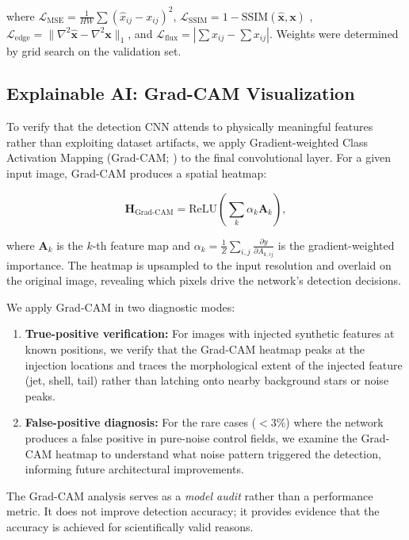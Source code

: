\documentclass[preprint2]{aastex631}
\begin{document}
where $\mathcal{L}_{\text{MSE}} = \frac{1}{HW}\sum(\hat{x}_{ij} - x_{ij})^2$, $\mathcal{L}_{\text{SSIM}} = 1 - \text{SSIM}(\hat{\mathbf{x}}, \mathbf{x})$ \citep{wang04}, $\mathcal{L}_{\text{edge}} = \|\nabla^2\hat{\mathbf{x}} - \nabla^2\mathbf{x}\|_1$, and $\mathcal{L}_{\text{flux}} = |\sum\hat{x}_{ij} - \sum x_{ij}|$. Weights were determined by grid search on the validation set.

\subsection{Explainable AI: Grad-CAM Visualization}\label{sec:xai}

To verify that the detection CNN attends to physically meaningful features rather than exploiting dataset artifacts, we apply Gradient-weighted Class Activation Mapping (Grad-CAM; \citealt{selvaraju17}) to the final convolutional layer. For a given input image, Grad-CAM produces a spatial heatmap:

\begin{equation}\label{eq:gradcam}
\mathbf{H}_{\text{Grad-CAM}} = \text{ReLU}\left(\sum_k \alpha_k \mathbf{A}_k\right),
\end{equation}

where $\mathbf{A}_k$ is the $k$-th feature map and $\alpha_k = \frac{1}{Z}\sum_{i,j}\frac{\partial y}{\partial A_{k,ij}}$ is the gradient-weighted importance. The heatmap is upsampled to the input resolution and overlaid on the original image, revealing which pixels drive the network's detection decisions.

We apply Grad-CAM in two diagnostic modes:

\begin{enumerate}
    \item \textbf{True-positive verification:} For images with injected synthetic features at known positions, we verify that the Grad-CAM heatmap peaks at the injection locations and traces the morphological extent of the injected feature (jet, shell, tail) rather than latching onto nearby background stars or noise peaks.
    \item \textbf{False-positive diagnosis:} For the rare cases ($<3\%$) where the network produces a false positive in pure-noise control fields, we examine the Grad-CAM heatmap to understand what noise pattern triggered the detection, informing future architectural improvements.
\end{enumerate}

The Grad-CAM analysis serves as a \textit{model audit} rather than a performance metric. It does not improve detection accuracy; it provides evidence that the accuracy is achieved for scientifically valid reasons.
\end{document}

